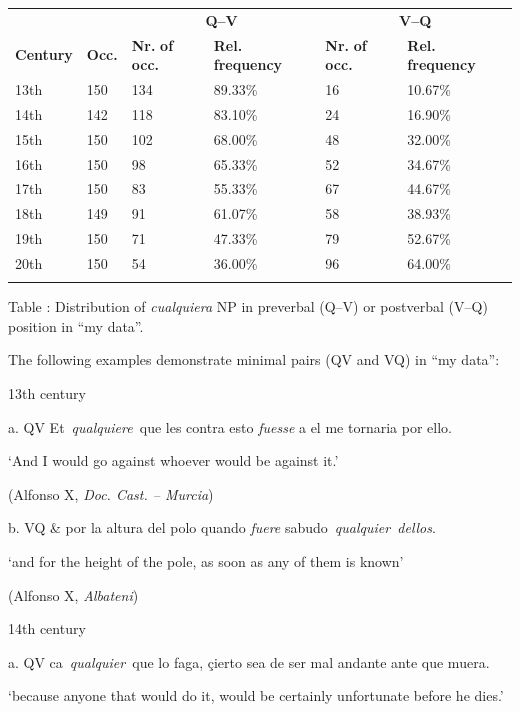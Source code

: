 \documentclass[output=paper]{langscibook}
\begin{document}
\begin{tabularx}{\textwidth}{XXXXXX}

\lsptoprule
\multicolumn{1}{c}{} &  & \multicolumn{2}{c}{ \textbf{Q–V}} & \multicolumn{2}{c}{ \textbf{V–Q}}\\
 \textbf{Century} & \textbf{Occ.} & \textbf{Nr.} \textbf{of} \textbf{occ.} & \textbf{Rel.} \textbf{frequency} & \textbf{Nr.} \textbf{of} \textbf{occ.} & \textbf{Rel.} \textbf{frequency}\\
 13th & 150 & 134 & 89.33\% & 16 & 10.67\%\\
 14th & 142 & 118 & 83.10\% & 24 & 16.90\%\\
 15th & 150 & 102 & 68.00\% & 48 & 32.00\%\\
 16th & 150 & 98 & 65.33\% & 52 & 34.67\%\\
 17th & 150 & 83 & 55.33\% & 67 & 44.67\%\\
 18th & 149 & 91 & 61.07\% & 58 & 38.93\%\\
 19th & 150 & 71 & 47.33\% & 79 & 52.67\%\\
 20th & 150 & 54 & 36.00\% & 96 & 64.00\%\\
\lspbottomrule
\end{tabularx}
Table : Distribution of \textit{cualquiera} NP in preverbal (Q–V) or postverbal (V–Q) position in “my data”.

The following examples demonstrate minimal pairs (QV and VQ) in “my data”:

  13th century

  a.  QV  Et~\textit{qualquiere~}que les contra esto \textit{fuesse} a el me tornaria por ello. 

      ‘And I would go against whoever would be against it.’

      (Alfonso X, \textit{Doc. Cast. – Murcia})

  b.  VQ  \& por la altura del polo quando \textit{fuere} sabudo~\textit{qualquier~dellos}. 

      ‘and for the height of the pole, as soon as any of them is known’

      (Alfonso X, \textit{Albateni})

  14th century

  a.  QV  ca~\textit{qualquier~}que lo faga, çierto sea de ser mal andante ante que muera. 

      ‘because anyone that would do it, would be certainly unfortunate before he dies.’
\end{document}
